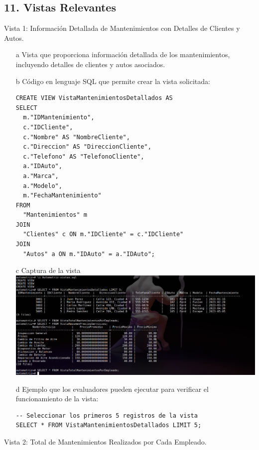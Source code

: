 \documentclass[12pt]{article}
\begin{document}
    \subsection*{11. Vistas Relevantes}
    Vista 1: Información Detallada de Mantenimientos con Detalles de Clientes y Autos.
    \begin{itemize}
        \item[a] Vista que proporciona información detallada de los mantenimientos, incluyendo detalles de clientes y autos asociados.
        \item[b] Código en lenguaje SQL que permite crear la vista solicitada:
        \begin{lstlisting}
CREATE VIEW VistaMantenimientosDetallados AS
SELECT
  m."IDMantenimiento",
  c."IDCliente",
  c."Nombre" AS "NombreCliente",
  c."Direccion" AS "DireccionCliente",
  c."Telefono" AS "TelefonoCliente",
  a."IDAuto",
  a."Marca",
  a."Modelo",
  m."FechaMantenimiento"
FROM
  "Mantenimientos" m
JOIN
  "Clientes" c ON m."IDCliente" = c."IDCliente"
JOIN
  "Autos" a ON m."IDAuto" = a."IDAuto";
        \end{lstlisting}
        \item[c] Captura de la vista
        \center\includegraphics[width=1.0\textwidth]{N.png}
        \item[d] Ejemplo que los evaluadores pueden ejecutar para verificar el funcionamiento de la vista:
        \begin{lstlisting}
-- Seleccionar los primeros 5 registros de la vista
SELECT * FROM VistaMantenimientosDetallados LIMIT 5;
        \end{lstlisting}
    \end{itemize}
    Vista 2: Total de Mantenimientos Realizados por Cada Empleado.
\end{document}
